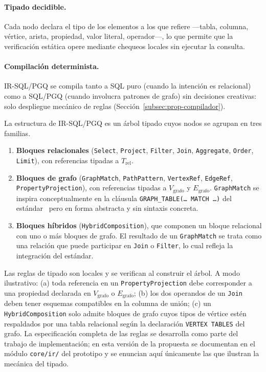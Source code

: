 \paragraph{Tipado decidible.} Cada nodo declara el tipo de los elementos a los que refiere ---tabla, columna, vértice, arista, propiedad, valor literal, operador---, lo que permite que la verificación estática opere mediante chequeos locales sin ejecutar la consulta.

\paragraph{Compilación determinista.} IR-SQL/PGQ se compila tanto a \ac{SQL} puro (cuando la intención es relacional) como a \ac{SQL}/\ac{PGQ} (cuando involucra patrones de grafo) sin decisiones creativas: solo despliegue mecánico de reglas (Sección~\ref{subsec:prop-compilador}).

\medskip

La estructura de IR-SQL/PGQ es un árbol tipado cuyos nodos se agrupan en tres familias.

\begin{enumerate}
    \item \textbf{Bloques relacionales} (\texttt{Select}, \texttt{Project}, \texttt{Filter}, \texttt{Join}, \texttt{Aggregate}, \texttt{Order}, \texttt{Limit}), con referencias tipadas a $T_{\mathrm{rel}}$.
    \item \textbf{Bloques de grafo} (\texttt{GraphMatch}, \texttt{PathPattern}, \texttt{VertexRef}, \texttt{EdgeRef}, \texttt{PropertyProjection}), con referencias tipadas a $V_{\mathrm{grafo}}$ y $E_{\mathrm{grafo}}$. \texttt{GraphMatch} se inspira conceptualmente en la cláusula \texttt{GRAPH\_TABLE(\ldots\ MATCH \ldots)} del estándar~\cite{DuckPGQ} pero en forma abstracta y sin sintaxis concreta.
    \item \textbf{Bloques híbridos} (\texttt{HybridComposition}), que componen un bloque relacional con uno o más bloques de grafo. El resultado de un \texttt{GraphMatch} se trata como una relación que puede participar en \texttt{Join} o \texttt{Filter}, lo cual refleja la integración del estándar.
\end{enumerate}

Las reglas de tipado son locales y se verifican al construir el árbol. A modo ilustrativo:
(a) toda referencia en un \texttt{PropertyProjection} debe corresponder a una propiedad declarada en $V_{\mathrm{grafo}}$ o $E_{\mathrm{grafo}}$;
(b) los dos operandos de un \texttt{Join} deben tener esquemas compatibles en la columna de unión;
(c) un \texttt{HybridComposition} solo admite bloques de grafo cuyos tipos de vértice estén respaldados por una tabla relacional según la declaración \texttt{VERTEX TABLES} del grafo. La especificación completa de las reglas se desarrolla como parte del trabajo de implementación; en esta versión de la propuesta se documentan en el módulo \texttt{core/ir/} del prototipo y se enuncian aquí únicamente las que ilustran la mecánica del tipado.

